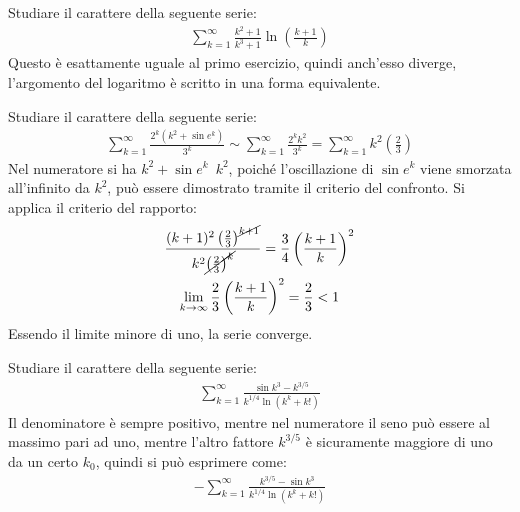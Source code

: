 \documentclass{article}
\numberwithin{equation}{subsection}
\begin{document}
Studiare il carattere della seguente serie:
\begin{gather*}
    \displaystyle\sum_{k=1}^\infty\frac{k^2+1}{k^3+1}\ln\left(\frac{k+1}{k}\right)
\end{gather*}
Questo è esattamente uguale al primo esercizio, quindi anch'esso diverge, l'argomento del logaritmo è scritto in una forma equivalente. 


Studiare il carattere della seguente serie:
\begin{gather*}
    \displaystyle\sum_{k=1}^\infty\frac{2^k(k^2+\sin e^k)}{3^k}\sim
    \displaystyle\sum_{k=1}^\infty\frac{2^kk^2}{3^k}=
    \displaystyle\sum_{k=1}^\infty k^2\left(\frac{2}{3}\right)
\end{gather*}
Nel numeratore si ha $k^2+\sin e^k$~$k^2$, poiché l'oscillazione di $\sin e^k$ viene smorzata all'infinito da $k^2$, può essere dimostrato tramite il criterio del confronto. 
Si applica il criterio del rapporto:
\begin{gather*}
    \displaystyle\frac{(k+1)^2\left(\frac{2}{3}\right)^{\cancel{k+1}}}{k^2\cancel{\left(\frac{2}{3}\right)^k}}=\frac{3}{4}\left(\frac{k+1}{k}\right)^2\\
    \lim_{k\to\infty}\frac{2}{3}\left(\frac{k+1}{k}\right)^2=\frac{2}{3}<1
\end{gather*}
Essendo il limite minore di uno, la serie converge. 

Studiare il carattere della seguente serie:
\begin{gather*}
    \displaystyle\sum_{k=1}^\infty\frac{\sin k^3-k^{3/5}}{k^{1/4}\ln(k^k+k!)}
\end{gather*}
Il denominatore è sempre positivo, mentre nel numeratore il seno può essere al massimo pari ad uno, mentre l'altro fattore $k^{3/5}$ è sicuramente maggiore di uno da un certo $k_0$, quindi si può esprimere come:
\begin{gather*}
    -\displaystyle\sum_{k=1}^\infty\frac{k^{3/5}-\sin k^3}{k^{1/4}\ln(k^k+k!)}
\end{gather*}
\end{document}
